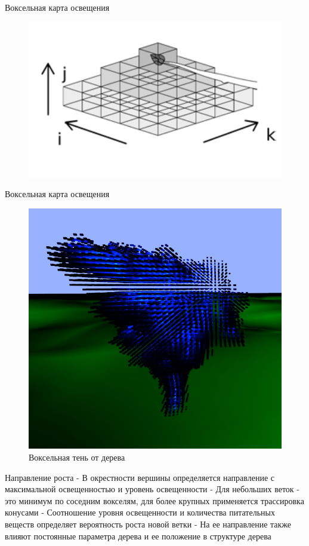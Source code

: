 \documentclass[11pt]{beamer}
\begin{document}
\begin{frame}{Воксельная карта освещения}
\begin{figure}[hbtp]
\includegraphics[scale=0.4]{shadow.png}
\end{figure}
\end{frame}
\begin{frame}{Воксельная карта освещения}
\begin{figure}[hbtp]
\includegraphics[scale=0.3]{voxels.png}
\caption{Воксельная тень от дерева}
\end{figure}
\end{frame}
\begin{frame}{Направление роста}
- В окрестности вершины определяется направление с максимальной освещенностью и уровень освещенности\linebreak 
- Для небольших веток - это минимум по соседним вокселям, для более крупных применяется трассировка конусами\linebreak 
- Соотношение уровня освещенности и количества питательных веществ определяет вероятность роста новой ветки\linebreak 
- На ее направление также влияют постоянные параметра дерева и ее положение в структуре дерева\linebreak 
\end{frame}
\end{document}

